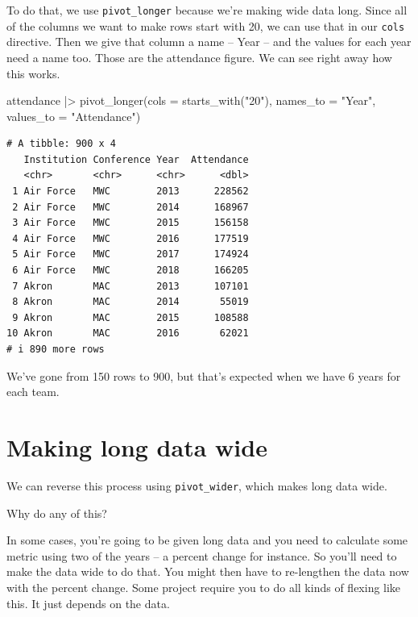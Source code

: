 \documentclass[
  letterpaper,
  DIV=11,
  numbers=noendperiod]{scrreprt}
\newenvironment{Shaded}{\begin{snugshade}}{\end{snugshade}}
\newcommand{\AttributeTok}[1]{\textcolor[rgb]{0.40,0.45,0.13}{#1}}
\newcommand{\FunctionTok}[1]{\textcolor[rgb]{0.28,0.35,0.67}{#1}}
\newcommand{\NormalTok}[1]{\textcolor[rgb]{0.00,0.23,0.31}{#1}}
\newcommand{\SpecialCharTok}[1]{\textcolor[rgb]{0.37,0.37,0.37}{#1}}
\newcommand{\StringTok}[1]{\textcolor[rgb]{0.13,0.47,0.30}{#1}}
\begin{document}
To do that, we use \texttt{pivot\_longer} because we're making wide data
long. Since all of the columns we want to make rows start with 20, we
can use that in our \texttt{cols} directive. Then we give that column a
name -- Year -- and the values for each year need a name too. Those are
the attendance figure. We can see right away how this works.

\begin{Shaded}
\begin{Highlighting}[]
\NormalTok{attendance }\SpecialCharTok{|\textgreater{}} \FunctionTok{pivot\_longer}\NormalTok{(}\AttributeTok{cols =} \FunctionTok{starts\_with}\NormalTok{(}\StringTok{"20"}\NormalTok{), }\AttributeTok{names\_to =} \StringTok{"Year"}\NormalTok{, }\AttributeTok{values\_to =} \StringTok{"Attendance"}\NormalTok{)}
\end{Highlighting}
\end{Shaded}

\begin{verbatim}
# A tibble: 900 x 4
   Institution Conference Year  Attendance
   <chr>       <chr>      <chr>      <dbl>
 1 Air Force   MWC        2013      228562
 2 Air Force   MWC        2014      168967
 3 Air Force   MWC        2015      156158
 4 Air Force   MWC        2016      177519
 5 Air Force   MWC        2017      174924
 6 Air Force   MWC        2018      166205
 7 Akron       MAC        2013      107101
 8 Akron       MAC        2014       55019
 9 Akron       MAC        2015      108588
10 Akron       MAC        2016       62021
# i 890 more rows
\end{verbatim}

We've gone from 150 rows to 900, but that's expected when we have 6
years for each team.

\hypertarget{making-long-data-wide}{%
\section{Making long data wide}\label{making-long-data-wide}}

We can reverse this process using \texttt{pivot\_wider}, which makes
long data wide.

Why do any of this?

In some cases, you're going to be given long data and you need to
calculate some metric using two of the years -- a percent change for
instance. So you'll need to make the data wide to do that. You might
then have to re-lengthen the data now with the percent change. Some
project require you to do all kinds of flexing like this. It just
depends on the data.
\end{document}
